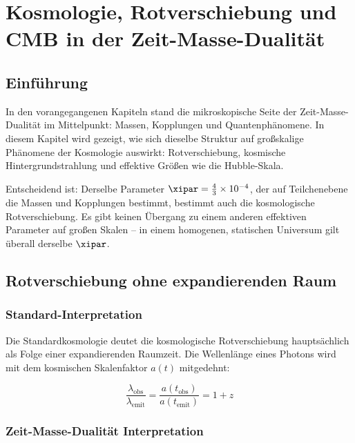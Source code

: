 
\chapter{Kosmologie, Rotverschiebung und CMB in der Zeit-Masse-Dualität}

\section{Einführung}

In den vorangegangenen Kapiteln stand die mikroskopische Seite der 
Zeit-Masse-Dualität im Mittelpunkt: Massen, Kopplungen und Quantenphänomene. 
In diesem Kapitel wird gezeigt, wie sich dieselbe Struktur auf großskalige 
Phänomene der Kosmologie auswirkt: Rotverschiebung, kosmische 
Hintergrundstrahlung und effektive Größen wie die Hubble-Skala.

Entscheidend ist: Derselbe Parameter $\xipar = \frac{4}{3} \times 10^{-4}$, 
der auf Teilchenebene die Massen und Kopplungen bestimmt, bestimmt auch die 
kosmologische Rotverschiebung. Es gibt keinen Übergang zu einem anderen 
effektiven Parameter auf großen Skalen -- in einem homogenen, statischen 
Universum gilt überall derselbe $\xipar$.

\section{Rotverschiebung ohne expandierenden Raum}

\subsection{Standard-Interpretation}

Die Standardkosmologie deutet die kosmologische Rotverschiebung hauptsächlich 
als Folge einer expandierenden Raumzeit. Die Wellenlänge eines Photons wird 
mit dem kosmischen Skalenfaktor $a(t)$ mitgedehnt:

\begin{equation}
\frac{\lambda_{\text{obs}}}{\lambda_{\text{emit}}} = \frac{a(t_{\text{obs}})}{a(t_{\text{emit}})} = 1 + z
\end{equation}

\subsection{Zeit-Masse-Dualität Interpretation}

